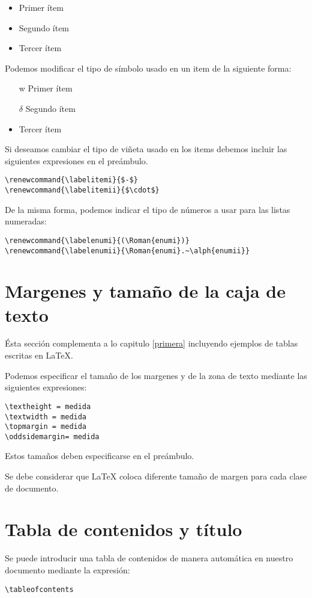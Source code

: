 \documentclass[letterpaper,12pt]{report}
\renewcommand{\labelitemi}{$-$}
\begin{document}
\begin{itemize}
	\item Primer ítem	
	\item Segundo ítem
	\item Tercer ítem
\end{itemize}


Podemos modificar el tipo de símbolo usado en un item de la siguiente forma:

\begin{itemize}
	\item[w] Primer ítem
	\item[$\delta$] Segundo ítem %
	\item Tercer ítem
\end{itemize}

Si deseamos cambiar el tipo de viñeta usado en los items debemos incluir las siguientes expresiones en el preámbulo.

\begin{verbatim}
\renewcommand{\labelitemi}{$-$}
\renewcommand{\labelitemii}{$\cdot$}
\end{verbatim}

De la misma forma, podemos indicar el tipo de números a usar para las listas numeradas:

\begin{verbatim}
\renewcommand{\labelenumi}{(\Roman{enumi})}
\renewcommand{\labelenumii}{\Roman{enumi}.~\alph{enumii}}
\end{verbatim}

\chapter{Margenes y tamaño de la caja de texto}

Ésta sección complementa a lo capitulo \ref{primera} incluyendo ejemplos de tablas escritas en \LaTeX.

Podemos especificar el tamaño de los margenes y de la zona de texto mediante las siguientes expresiones:

\begin{verbatim}
\textheight = medida
\textwidth = medida
\topmargin = medida
\oddsidemargin= medida
\end{verbatim}

Estos tamaños deben especificarse en el preámbulo.

Se debe considerar que \LaTeX{} coloca diferente tamaño de margen para cada clase de documento.

\chapter{Tabla de contenidos y título}

Se puede introducir una tabla de contenidos de manera automática en nuestro documento mediante la expresión:

\begin{verbatim}
\tableofcontents
\end{verbatim}
\end{document}
